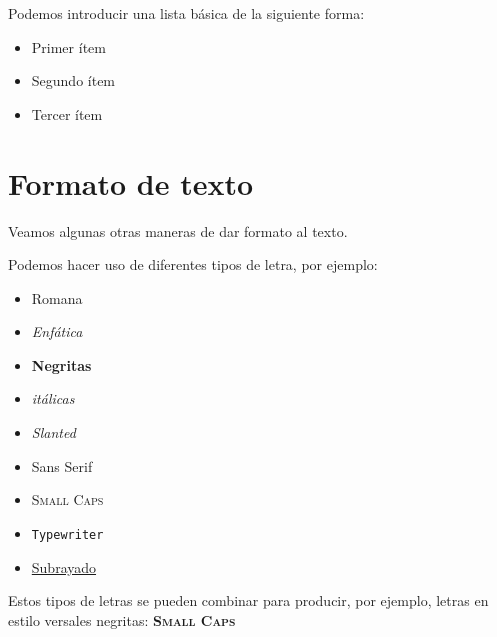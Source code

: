 \documentclass[letterpaper,11pt]{article}
\begin{document}

Podemos introducir una lista básica de la siguiente forma:

\begin{itemize}
\item Primer ítem
\item Segundo ítem
\item Tercer ítem
\end{itemize}

\section{Formato de texto}

Veamos algunas otras maneras de dar formato al texto.

Podemos hacer uso de diferentes tipos de letra, por ejemplo:

\begin{itemize}
\item \textrm{Romana}

\item \emph{Enfática}

\item \textbf{Negritas}

\item \textit{itálicas}

\item \textsl{Slanted}

\item \textsf{Sans Serif}

\item \textsc{Small Caps}

\item \texttt{Typewriter}

\item \underline{Subrayado}

\end{itemize}

Estos tipos de letras se pueden combinar para producir, por ejemplo, letras en estilo versales negritas: \textbf{\textsc{Small Caps}}

\end{document}
